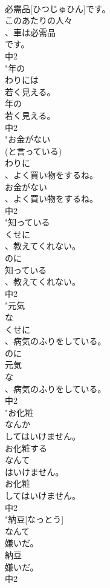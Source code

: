 \documentclass[8pt]{extreport}
\begin{document}
\begin{CJK}{UTF8}{min}
\\	必需品[ひつじゅひん]です。
\\	このあたりの人々
\\	、車は必需品
\\	です。
\\	中2
\\	"年の
\\	わりには
\\	若く見える。
\\	年の
\\	若く見える。
\\	中2
\\	"お金がない
\\	(と言っている)
\\	わりに
\\	、よく買い物をするね。
\\	お金がない
\\	、よく買い物をするね。
\\	中2
\\	"知っている
\\	くせに
\\	、教えてくれない。
\\	のに
\\	知っている
\\	、教えてくれない。
\\	中2
\\	"元気
\\	な
\\	くせに
\\	、病気のふりをしている。
\\	のに
\\	元気
\\	な
\\	、病気のふりをしている。
\\	中2
\\	"お化粧
\\	なんか
\\	してはいけません。
\\	お化粧する
\\	なんて
\\	はいけません。
\\	お化粧
\\	してはいけません。
\\	中2
\\	"納豆[なっとう]
\\	なんて
\\	嫌いだ。
\\	納豆
\\	嫌いだ。
\\	中2

\end{CJK}
\end{document}
